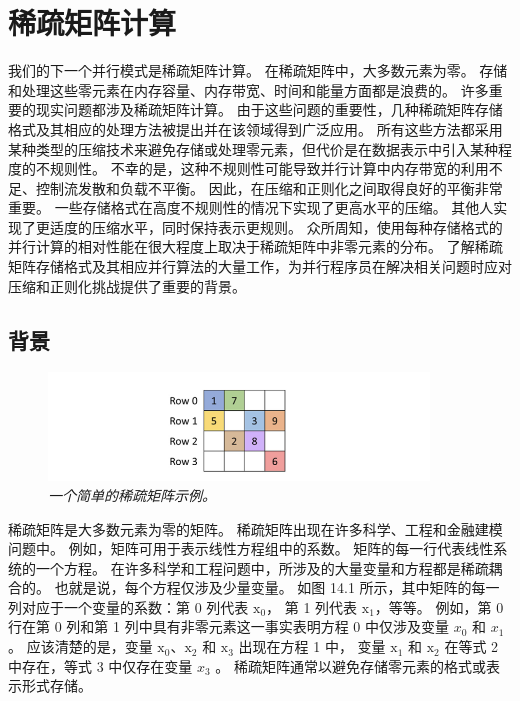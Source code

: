 \section{稀疏矩阵计算}
我们的下一个并行模式是稀疏矩阵计算。 在稀疏矩阵中，大多数元素为零。 
存储和处理这些零元素在内存容量、内存带宽、时间和能量方面都是浪费的。 许多重要的现实问题都涉及稀疏矩阵计算。 
由于这些问题的重要性，几种稀疏矩阵存储格式及其相应的处理方法被提出并在该领域得到广泛应用。 
所有这些方法都采用某种类型的压缩技术来避免存储或处理零元素，但代价是在数据表示中引入某种程度的不规则性。 
不幸的是，这种不规则性可能导致并行计算中内存带宽的利用不足、控制流发散和负载不平衡。 
因此，在压缩和正则化之间取得良好的平衡非常重要。 一些存储格式在高度不规则性的情况下实现了更高水平的压缩。 
其他人实现了更适度的压缩水平，同时保持表示更规则。 
众所周知，使用每种存储格式的并行计算的相对性能在很大程度上取决于稀疏矩阵中非零元素的分布。 
了解稀疏矩阵存储格式及其相应并行算法的大量工作，为并行程序员在解决相关问题时应对压缩和正则化挑战提供了重要的背景。

\subsection{背景}
\begin{figure}[H]
	\centering
	\includegraphics[width=0.9\textwidth]{figs/F14.1.png}
	\caption{\textit{一个简单的稀疏矩阵示例。}}
\end{figure}

稀疏矩阵是大多数元素为零的矩阵。 稀疏矩阵出现在许多科学、工程和金融建模问题中。 例如，矩阵可用于表示线性方程组中的系数。 
矩阵的每一行代表线性系统的一个方程。 在许多科学和工程问题中，所涉及的大量变量和方程都是稀疏耦合的。 
也就是说，每个方程仅涉及少量变量。 
如图 14.1 所示，其中矩阵的每一列对应于一个变量的系数：第 0 列代表 $\mathrm{x}_{0}$，
第 1 列代表 $\mathrm{x}_{1 }$，等等。 
例如，第 0 行在第 0 列和第 1 列中具有非零元素这一事实表明方程 0 中仅涉及变量 $x_{0}$ 和 $x_{1}$ 。 
应该清楚的是，变量 $\mathrm{x}_{0}、\mathrm{x}_{2}$ 和 $\mathrm{x}_{3}$ 出现在方程 1 中，
变量 $\mathrm{x}_{1}$ 和 $\mathrm{x}_{2}$ 在等式 2 中存在，等式 3 中仅存在变量 $x_{3}$ 。 
稀疏矩阵通常以避免存储零元素的格式或表示形式存储。


